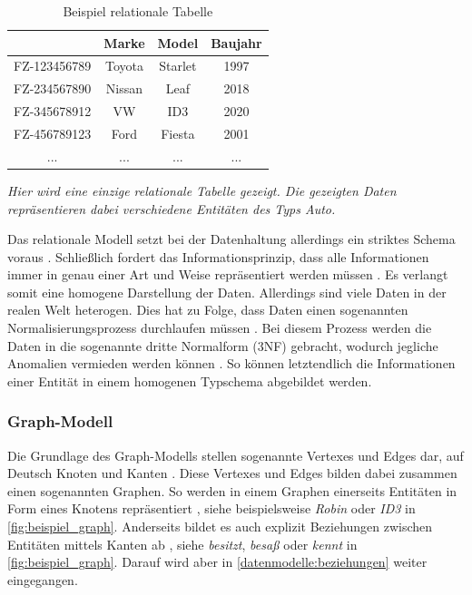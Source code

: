 \begin{table}[h]
    \centering
    \begin{tabular}{c|c|c|c}
    \hline
    \rowcolor[HTML]{EFEFEF} 
    \multicolumn{1}{l|}{\cellcolor[HTML]{EFEFEF}\textbf{Fahrzeugnummer}} & \multicolumn{1}{l|}{\cellcolor[HTML]{EFEFEF}\textbf{Marke}} & \multicolumn{1}{l|}{\cellcolor[HTML]{EFEFEF}\textbf{Model}} & \multicolumn{1}{l}{\cellcolor[HTML]{EFEFEF}\textbf{Baujahr}} \\ \hline
    FZ-123456789 & Toyota & Starlet & 1997 \\
    FZ-234567890 & Nissan & Leaf & 2018 \\
    FZ-345678912 & VW & ID3 & 2020 \\
    FZ-456789123 & Ford & Fiesta & 2001 \\
    ... & ... & ... & ... \\ \hline
    \end{tabular}
    \caption{Beispiel relationale Tabelle}
    \vspace{0.1em}
    \textit{Hier wird eine einzige relationale Tabelle gezeigt. Die gezeigten Daten repräsentieren dabei verschiedene Entitäten des Typs Auto.}
    \label{tab:auto_tabelle}
\end{table}

Das relationale Modell setzt bei der Datenhaltung allerdings ein striktes Schema voraus \cite{rdbms_book}. Schließlich fordert das Informationsprinzip, dass alle Informationen immer in genau einer Art und Weise repräsentiert werden müssen \cite{rdbms_history}. Es verlangt somit eine homogene Darstellung der Daten. Allerdings sind viele Daten in der realen Welt heterogen. Dies hat zu Folge, dass Daten einen sogenannten Normalisierungsprozess durchlaufen müssen \cite{rdbms_book}. Bei diesem Prozess werden die Daten in die sogenannte dritte Normalform (3NF) gebracht, wodurch jegliche Anomalien vermieden werden können \cite{rdbms_book}. So können letztendlich die Informationen einer Entität in einem homogenen Typschema abgebildet werden. 

\subsubsection{Graph-Modell}
Die Grundlage des Graph-Modells stellen sogenannte Vertexes und Edges dar, auf Deutsch Knoten und Kanten \cite{gdbms}. Diese Vertexes und Edges bilden dabei zusammen einen sogenannten Graphen. So werden in einem Graphen einerseits Entitäten in Form eines Knotens repräsentiert \cite{gdbms}, siehe beispielsweise \textit{Robin} oder \textit{ID3} in \autoref{fig:beispiel_graph}. Anderseits bildet es auch explizit Beziehungen zwischen Entitäten mittels Kanten ab \cite{gdbms}, siehe \textit{besitzt}, \textit{besaß} oder \textit{kennt} in \autoref{fig:beispiel_graph}. Darauf wird aber in \autoref{datenmodelle:beziehungen} weiter eingegangen.

